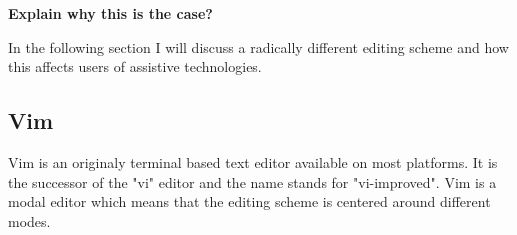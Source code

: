 \documentclass[a4paper,english]{ifimaster}
\begin{document}
\textbf{Explain why this is the case?}

In the following section I will discuss a radically different editing scheme and how this affects users of assistive technologies.

\subsection{Vim}
Vim is an originaly terminal based text editor available on most platforms.
It is the successor of the "vi" editor and the name stands for "vi-improved".
Vim is a modal editor which means that the editing scheme is centered around different modes.







\end{document}
